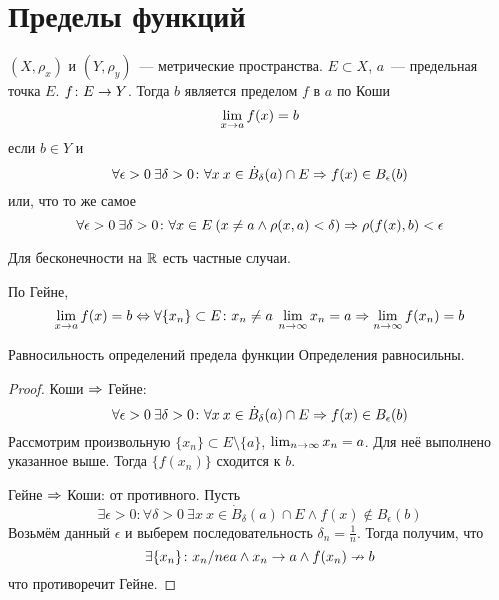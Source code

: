 \section{Пределы функций}

\begin{Def}
$(X, \rho_x)$ и $(Y, \rho_y)$~--- метрические пространства. $E \subset X$, $a$~--- предельная точка $E$. $f\colon E \rightarrow Y$.
Тогда $b$ является пределом $f$ в $a$ по Коши
$$\lim_{x \rightarrow a} f(x) = b$$
если $b \in Y$ и
$$\forall \epsilon>0\: \exists \delta > 0\colon \forall x\: x \in \dot B_\delta(a) \cap E \Rightarrow f(x) \in B_\epsilon (b)$$
или, что то же самое
$$\forall \epsilon>0\: \exists \delta > 0\colon \forall x\in E \: (x \ne a \land \rho(x, a) < \delta) \Rightarrow \rho(f(x), b) < \epsilon$$
\end{Def}

\begin{Rem}
Для бесконечности на $\mathbb{R}$ есть частные случаи.
\end{Rem}

\begin{Def}
По Гейне,
$$\lim_{x \rightarrow a} f(x) = b \Leftrightarrow \forall \{x_n\}\subset E\colon x_n \ne a\: \lim_{n\rightarrow \infty} x_n = a \Rightarrow \lim_{n \rightarrow \infty} f(x_n) = b$$
\end{Def}

\begin{theorem}{Равносильность определений предела функции}
Определения равносильны.
\end{theorem}
\begin{proof}
Коши $\Rightarrow$ Гейне:
$$\forall \epsilon>0\: \exists \delta > 0\colon \forall x\: x \in \dot B_\delta(a) \cap E \Rightarrow f(x) \in B_\epsilon (b)$$
Рассмотрим произвольную $\{x_n\} \subset E \setminus \{a\}$, $\lim_{n\rightarrow\infty} x_n = a$. Для неё выполнено указанное выше. Тогда $\{f(x_n)\}$ сходится к $b$.

Гейне $\Rightarrow$ Коши: от противного. Пусть
$$\exists \epsilon>0\colon \forall \delta > 0\: \exists x\: x \in \dot B_\delta(a) \cap E \land f(x) \notin B_\epsilon(b)$$
Возьмём данный $\epsilon$ и выберем последовательность $\delta_n = \frac1n$. Тогда получим, что
$$\exists \{x_n\}\colon x_n /ne a \land x_n \rightarrow a \land f(x_n) \nrightarrow b$$
что противоречит Гейне.
\end{proof}